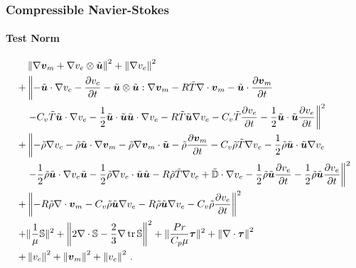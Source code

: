 \documentclass[18pt,xcolor=table]{beamer}
\begin{document}
\begin{frame}[t]
\frametitle{Compressible Navier-Stokes}
\framesubtitle{Test Norm}  %
\vspace{-3ex}
{
\small
\begin{align*}
&\left\| \nabla\boldsymbol v_m+\nabla v_e\otimes\tilde{\boldsymbol u} \right\|^2+\left\| \nabla v_e \right\|^2\\
+&\left\|
-\tilde{\boldsymbol u}\cdot\nabla v_c-\frac{\partial v_c}{\partial t}-\tilde{\boldsymbol u}\otimes\tilde{\boldsymbol u}:\nabla\boldsymbol v_m
-R\tilde T\nabla\cdot\boldsymbol v_m-\tilde{\boldsymbol u}\cdot\frac{\partial\boldsymbol v_m}{\partial t}\right.\\
&\left.-C_v\tilde T\tilde{\boldsymbol u}\cdot\nabla v_e-\frac{1}{2}\tilde{\boldsymbol u}\cdot\tilde{\boldsymbol u}\tilde{\boldsymbol u}\cdot\nabla v_e
-R\tilde T\tilde{\boldsymbol u}\nabla v_e
-C_v\tilde T\frac{\partial v_e}{\partial t}-\frac{1}{2}\tilde{\boldsymbol u}\cdot\tilde{\boldsymbol u}\frac{\partial v_e}{\partial t}
\right\|^2\\
+&\left\|
-\tilde\rho\nabla v_c
-\tilde\rho\tilde{\boldsymbol u}\cdot\nabla\boldsymbol v_m-\tilde\rho\nabla\boldsymbol v_m\cdot\tilde{\boldsymbol u}
-\tilde\rho\frac{\partial\boldsymbol v_m}{\partial t}
-C_v\tilde\rho\tilde T\nabla v_e
-\frac{1}{2}\tilde\rho\tilde{\boldsymbol u}\cdot\tilde{\boldsymbol u}\nabla v_e
\right.\\
&\left.
-\frac{1}{2}\tilde\rho\tilde{\boldsymbol u}\cdot\nabla v_e\tilde{\boldsymbol u}
-\frac{1}{2}\tilde\rho\nabla v_e\cdot\tilde{\boldsymbol u}\tilde{\boldsymbol u}
-R\tilde\rho\tilde T\nabla v_e
+\tilde{\mathbb{D}}\cdot\nabla v_e
-\frac{1}{2}\tilde\rho\tilde{\boldsymbol u}\frac{\partial v_e}{\partial t}
-\frac{1}{2}\tilde\rho\tilde{\boldsymbol u}\frac{\partial v_e}{\partial t}
\right\|^2\\
+&\left\|
-R\tilde\rho\nabla\cdot\boldsymbol v_m
-C_v\tilde\rho\tilde{\boldsymbol u}\nabla v_e
-R\tilde\rho\tilde{\boldsymbol u}\nabla v_e
-C_v\tilde\rho\frac{\partial v_e}{\partial t}
\right\|^2\\
+&\|\frac{1}{\mu}\mathbb{S}\|^2
+\left\| 2\nabla\cdot\mathbb{S}-\frac{2}{3}\nabla\operatorname*{tr}{\mathbb{S}} \right\|^2
+\|\frac{Pr}{C_p\mu}\boldsymbol\tau\|^2
+\left\| \nabla\cdot\boldsymbol\tau \right\|^2\\
+&\left\| v_c \right\|^2+\left\| \boldsymbol v_m \right\|^2+\left\| v_e \right\|^2
\,.
\end{align*}
}
\end{frame}

\end{document}
